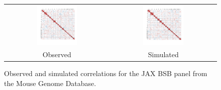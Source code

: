 \documentclass{article}
\begin{document}
\begin{figure}[htp]
  \begin{center}
    \begin{tabular}{cc}
      \includegraphics[width = 0.400\textwidth]{./img/jaxbsb.png} &
      \includegraphics[width = 0.400\textwidth]{./img/jaxbsb_sim.png} \\
      {\footnotesize Observed} &
      {\footnotesize Simulated}
    \end{tabular}
  \end{center}
  \caption{Observed and simulated correlations for the JAX BSB panel from the Mouse Genome Database.}
  \label{fig:jaxbsb}
\end{figure}
\end{document}
